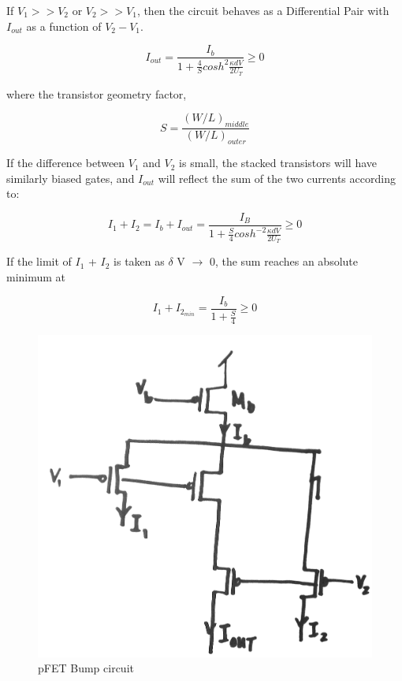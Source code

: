 If $V_1 >> V_2$ or $V_2 >> V_1$, then the circuit behaves as a Differential Pair with $I_{out}$ as a function of $V_2 -V_1$.

\begin{equation}
I_{out} = \frac{I_b}{1+\frac{4}{S}cosh^2 \frac{\kappa dV}{2U_T}} \geq 0
\end{equation}

where the transistor geometry factor, 

\begin{equation}
S = \frac{(W/L)_{middle}}{(W/L)_{outer}}
\end{equation}

If the difference between $V_1$ and $V_2$ is small, the stacked transistors will have similarly biased gates, and $I_{out}$ will reflect the sum of the two currents according to:

\begin{equation}
I_1+I_2 = I_b+I_{out}= \frac{I_B}{1+ \frac{S}{4} cosh^{-2} \frac{\kappa dV}{2U_T}} \geq 0
\end{equation}

If the limit of $I_1$ + $I_2$ is taken as $\delta$ V $\rightarrow$ 0, the sum reaches an absolute minimum at 

\begin{equation}
I_1+I_{2_{min}} = \frac{I_b}{1+\frac{S}{4}} \geq 0
\end{equation}


\begin{figure}[htbp]
  \centering
  \includegraphics[scale=0.2]{pics/pFET_Bump_circuit}
  \caption{pFET Bump circuit}
  \label{fig:pFET_Bump_circuit}
\end{figure}




